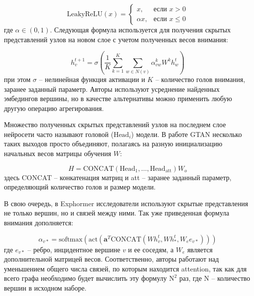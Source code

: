 \begin{equation}
    \text{LeakyReLU}(x) = \begin{cases}
        x, & \text{если } x > 0 \\
        \alpha x, & \text{если } x \leq 0
    \end{cases}
\end{equation}
где \(\alpha \in (0, 1)\). Следующая формула используется для получения скрытых представлений узлов на новом слое с учетом полученных весов внимания:

\begin{equation}
    h_v^{t+1} = \sigma \left( \frac{1}{K} \sum_{k=1}^{K} \sum_{w \in N(v)} \alpha_{vw}^k W^k h_{w}^t \right)
\end{equation}
при этом \(\sigma\) -- нелинейная функция активации и \(K\) -- количество голов внимания, заранее заданный параметр. Авторы используют усреднение найденных эмбедингов вершины, но в качестве альтернативы можно применить любую другую операцию агрегирования.

Множество полученных скрытых представлений узлов на последнем слое нейросети часто называют головой (\(\text{Head}_i\)) модели. В работе GTAN \cite{xiang2023} несколько таких выходов просто объединяют, полагаясь на разную инициализацию начальных весов матрицы обучения \(W\):

\begin{equation}
    H = \text{CONCAT}(\text{Head}_1, \ldots, \text{Head}_{\text{att}}) W_o
\end{equation}
здесь CONCAT -- конкатенация матриц и att -- заранее заданный параметр, определяющий количество голов и размер модели.

В свою очередь, в Exphormer \cite{shirzad2023} исследователи используют скрытые представления не только вершин, но и связей между ними. Так уже приведенная формула внимания дополняется:

\begin{equation}
    \alpha_{v \ast} = \text{softmax} \left(\text{act} \left( \mathbf{a}^T \text{CONCAT} (W h_v^t, W h_\ast^t, W_e e_{v\ast}) \right) \right)
\end{equation}
где \(e_{v\ast}\) -- ребро, инцидентное вершине \(v\) и ее соседям, а \(W_e\) является дополнительной матрицей весов. Соответственно, авторы работают над уменьшением общего числа связей, по которым находится attention, так как для всего графа необходимо будет вычислить эту формулу \(\text{N}^2\) раз, где N -- количество вершин в исходном наборе.

\pagebreak
